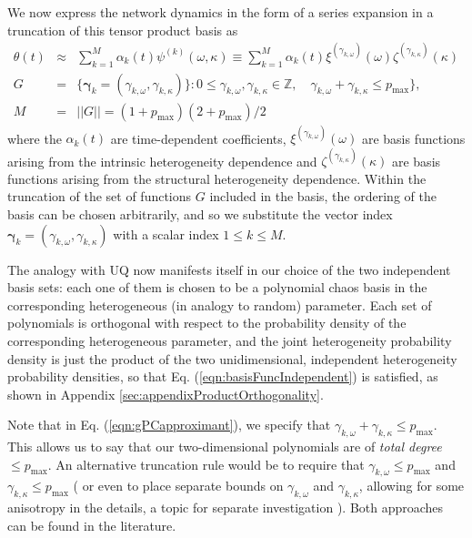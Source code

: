 \documentclass[numbers]{frontiersSCNS}
\renewcommand{\vec}[1]{\bm{#1}}
\newcommand{\degree}{\kappa}
\newcommand{\numCofs}{{M}}
\newcommand{\basisFuncSymbol}{\psi}
\newcommand{\basisFunc}[1]{\basisFuncSymbol^{(#1)}}
\newcommand{\eqnRef}[1]{Eq. (\ref{eqn:#1})}
\newcommand{\appendixRef}[1]{Appendix \ref{sec:#1}}
\newcommand{\omegaOneDFunc}{\xi}
\newcommand{\degreeOneDFunc}{\zeta}
\newcommand{\multiIndexCharacter}{\gamma}
\newcommand{\multiIndex}{\vec{\multiIndexCharacter}}
\newcommand{\indexSet}{G}
\newcommand{\scalarFuncIndex}{k}
\newcommand{\multiIndexA}{\multiIndexCharacter_{\scalarFuncIndex,\omega}}
\newcommand{\multiIndexB}{\multiIndexCharacter_{\scalarFuncIndex,\degree}}
\begin{document}
We now express the network dynamics in the form of a series expansion
in a truncation of this tensor product basis as
\begin{equation}
\label{eqn:gPCapproximant}
\begin{array}{rcl}
 \theta(t) & \approx & \sum_{\scalarFuncIndex=1}^\numCofs
    \alpha_{\scalarFuncIndex}(t) \basisFunc{\scalarFuncIndex} (\omega, \degree)
    \equiv \sum_{\scalarFuncIndex=1}^\numCofs
        \alpha_{\scalarFuncIndex}(t)
        \omegaOneDFunc^{ (\multiIndexA)}(\omega)
        \degreeOneDFunc^{(\multiIndexB)}(\degree)
    \\
    \indexSet&=&\{\multiIndex_{\scalarFuncIndex} = (\multiIndexA, \multiIndexB)\}
    :
    0 \le \multiIndexA, \multiIndexB \in\mathbb Z, \quad \multiIndexA + \multiIndexB \le p_\mathrm{max}
    \},
    \\
    \numCofs &=&||\indexSet|| = (1 + p_\text{max}) (2 + p_\text{max}) / 2
\end{array}
\end{equation}
where the $\alpha_{\scalarFuncIndex}(t)$ are time-dependent coefficients,
$\omegaOneDFunc^{(\multiIndexA)}(\omega)$
are basis functions arising from the intrinsic heterogeneity dependence
and $\degreeOneDFunc^{(\multiIndexB)}(\degree)$
are basis functions arising from the structural heterogeneity dependence.
%
Within the truncation of the set of functions $\indexSet$ included in the basis,
the ordering of the basis can be chosen arbitrarily, and so we substitute the
vector index $\multiIndex_{\scalarFuncIndex} = (\multiIndexA, \multiIndexB)$
with a scalar index $1 \le k \le \numCofs$.

The analogy with UQ now manifests itself in our
choice of the two independent basis sets: each one of them is chosen to be a polynomial chaos
basis in the corresponding heterogeneous (in analogy to random) parameter.
%
Each set of polynomials is orthogonal with respect to the probability density of the
corresponding heterogeneous parameter,
and the joint heterogeneity probability
density is just the product of the two unidimensional, independent heterogeneity probability
densities, so that \eqnRef{basisFuncIndependent} is satisfied,
as shown in \appendixRef{appendixProductOrthogonality}.


\newcommand{\pmax}{p_\mathrm{max}}
Note that in \eqnRef{gPCapproximant}, we specify that $\multiIndexA + \multiIndexB \le \pmax$.
%
This allows us to say that our two-dimensional polynomials are of {\em total degree}
$\le \pmax$.
%
An alternative truncation rule would be
to require that $\multiIndexA \le \pmax$ and $\multiIndexB \le \pmax$
(%
    or even to place separate bounds on $\multiIndexA$ and $\multiIndexB$,
    allowing for some anisotropy in the details,
    a topic for separate investigation%
).
%
Both approaches can be found in the literature.
\end{document}
